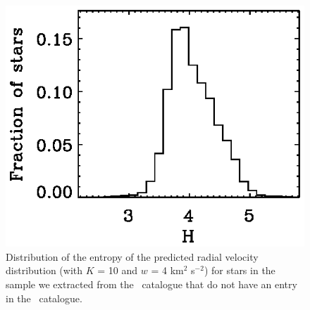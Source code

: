 \clearpage
\begin{figure}
\includegraphics{figs_veldist/hist_hip_ent.ps}
\caption[Distribution of the entropy of the predicted radial velocity distribution for stars in the sample we extracted from the \Hipparcos\ catalogue that do not have an entry in the \gcsabb\ catalogue]{Distribution of the entropy of the predicted radial velocity distribution (with $K$ = 10 and $w$ = 4 km$^2$ s$^{-2}$) for stars in the sample we extracted from the \Hipparcos\ catalogue that do not have an entry in the \gcsabb\ catalogue.}%
\label{fig:hist_hip_ent}
\end{figure}


